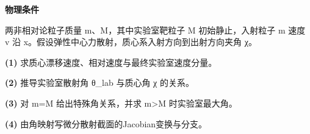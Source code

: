 \textbf{物理条件}\par 两非相对论粒子质量 m、M，其中实验室靶粒子 M 初始静止，入射粒子 m 速度 v 沿 x。假设弹性中心力散射，质心系入射方向到出射方向夹角 χ。
\par\noindent\textbf{(1)} 求质心漂移速度、相对速度与最终实验室速度分量。
\par\noindent\textbf{(2)} 推导实验室散射角 θ\_lab 与质心角 χ 的关系。
\par\noindent\textbf{(3)} 对 m=M 给出特殊角关系，并求 m>M 时实验室最大角。
\par\noindent\textbf{(4)} 由角映射写微分散射截面的Jacobian变换与分支。
